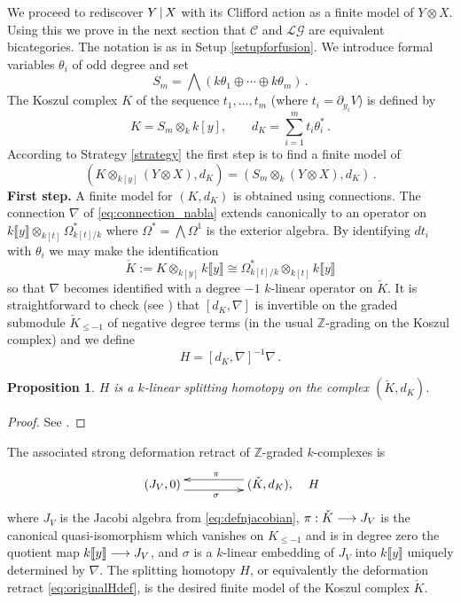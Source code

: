 \documentclass[english,letter paper,12pt,leqno]{article}
\newtheorem{proposition}[theorem]{Proposition}
\theoremstyle{example}
\numberwithin{equation}{section}
\def\LG{\mathcal{LG}}
\def\nZ{\mathds{Z}}
\def\L{\mathcal{C}}
\begin{document}
We proceed to rediscover $Y \,|\, X$ with its Clifford action as a finite model of $Y \otimes X$. Using this we prove in the next section that $\L$ and $\LG$ are equivalent bicategories. The notation is as in Setup \ref{setupforfusion}. We introduce formal variables $\theta_i$ of odd degree and set
\[
S_m = \bigwedge\left( k \theta_1 \oplus \cdots \oplus k \theta_m \right)\,.
\]
The Koszul complex $K$ of the sequence $t_1,\ldots,t_m$ (where $t_i = \partial_{y_i} V$) is defined by
\begin{equation}\label{defn:koszul}
K = S_m \otimes_k k[y], \qquad d_K = \sum_{i=1}^m t_i \theta_i^*\,.
\end{equation}
According to Strategy \ref{strategy} the first step is to find a finite model of
\[
( K \otimes_{k[y]} ( Y \otimes X ), d_K ) = ( S_m \otimes_k ( Y \otimes X ), d_K )\,.
\]
\textbf{First step.} A finite model for $(K, d_K)$ is obtained using connections. The connection $\nabla$ of \eqref{eq:connection_nabla} extends canonically to an operator on $k\llbracket y \rrbracket \otimes_{k[t]} \Omega^*_{k[t]/k}$ where $\Omega^* = \bigwedge \Omega^1$ is the exterior algebra. By identifying $d t_i$ with $\theta_i$ we may make the identification
\[
\check{K} := K \otimes_{k[y]} k\llbracket y \rrbracket \cong \Omega^*_{k[t]/k} \otimes_{k[t]} k\llbracket y \rrbracket 
\]
so that $\nabla$ becomes identified with a degree $-1$ $k$-linear operator on $\check{K}$.  It is straightforward to check (see \cite[Lemma 8.7]{dm1102.2957}) that $[d_K, \nabla]$ is invertible on the graded submodule $\check{K}_{\le -1}$ of negative degree terms (in the usual $\nZ$-grading on the Koszul complex) and we define
\[
H = [d_K, \nabla]^{-1} \nabla\,.
\]

\begin{proposition} $H$ is a $k$-linear splitting homotopy on the complex $(\check{K},d_K)$.
\end{proposition}
\begin{proof}
See \cite[Section 8.1]{dm1102.2957}.
\end{proof}

The associated strong deformation retract of $\mathbb{Z}$-graded $k$-complexes is
\begin{equation}\label{eq:originalHdef}
\xymatrix@C+2pc{
(J_V,0) \ar@<-1ex>[r]_{\sigma} & (\check{K}, d_K), \ar@<-1ex>[l]_{\pi}
} \quad H
\end{equation}
where $J_V$ is the Jacobi algebra from \eqref{eq:defnjacobian}, $\pi: \check{K} \longrightarrow J_V$ is the canonical quasi-isomorphism which vanishes on $K_{\le -1}$ and is in degree zero the quotient map $k\llbracket y \rrbracket \longrightarrow J_V$, and $\sigma$ is a $k$-linear embedding of $J_V$ into $k\llbracket y \rrbracket$ uniquely determined by $\nabla$. The splitting homotopy $H$, or equivalently the deformation retract \eqref{eq:originalHdef}, is the desired finite model of the Koszul complex $\check{K}$.
\end{document}
